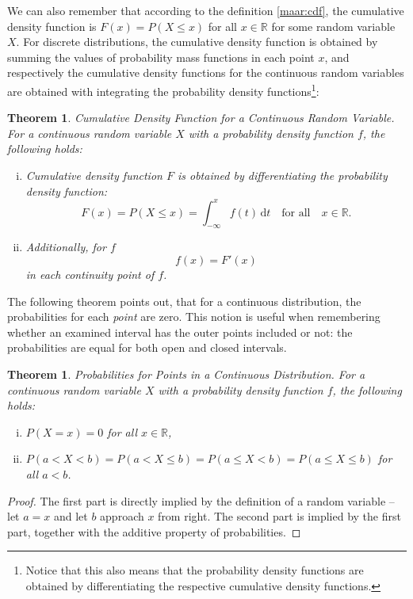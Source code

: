 \documentclass[12pt,a4paper,leqno]{report}
\newcommand{\R}{\mathbb{R}}
\newcommand{\dif}{\,\mathrm{d}}
\theoremstyle{plain}
\newtheorem{lause}[equation]{Theorem}
\theoremstyle{definition}
\begin{document}
We can also remember that according to the definition \ref{maar:cdf},
the cumulative density function is $F(x) = P(X \leq x)$ for all $ x \in \R$ for some random variable $X$. For discrete distributions, the cumulative density function is obtained by summing the values of probability mass functions in each point $x$, and respectively the cumulative density functions for the continuous random variables are obtained with integrating the probability density functions\footnote{Notice that this also means that the probability density functions are obtained by differentiating the respective cumulative density functions.}:

\begin{lause}
Cumulative Density Function for a Continuous Random Variable.  For a continuous random variable $X$ with a probability density function $f$, the following holds:
\begin{enumerate}[(i)]
\item Cumulative density function $F$ is obtained by differentiating the probability density function:
\[
F(x) = P(X \leq x) = \int_{-\infty}^x f(t)\dif{t} \quad \text{for all} \quad x \in \R.
\] 
\item Additionally, for $f$ 
\[
f(x) = F'(x) 
\]
in each continuity point of $f$.
\end{enumerate}
\end{lause}

The following theorem points out, that for a continuous distribution, the probabilities for each \emph{point} are zero. This notion is useful when remembering whether an examined interval has the outer points included or not: the probabilities are equal for both open and closed intervals.

\begin{lause}
\label{lause:pmf0}
Probabilities for Points in a Continuous Distribution. For a continuous random variable $X$ with a probability density function $f$, the following holds:
\begin{enumerate}[(i)]
\item $P(X = x) = 0$ for all $x \in \R$,
\item $P(a < X < b) = P(a < X \leq b) = P(a \leq X < b) = P(a \leq X \leq b)$ for all $a<b$. 
\end{enumerate}
\end{lause}

\begin{proof}
The first part is directly implied by the definition of a random variable -- let $a=x$ and let $b$ approach $x$ from right. The second part is implied by the first part, together with the additive property of probabilities.
\end{proof}
\end{document}
